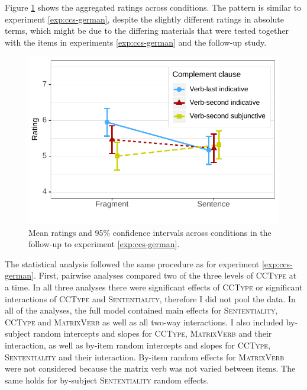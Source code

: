 Figure \ref{fig:ccs-german-short-estimates} shows the aggregated ratings across conditions. The pattern is similar to experiment \ref{exp:ccs-german}, despite the slightly different ratings in absolute terms, which might be due to the differing materials that were tested together with the items in experiments \ref{exp:ccs-german} and the follow-up study.
%
\begin{figure}[t]
\includegraphics[scale=1]{figures/ex2b_ccs_de_sc_estimates}
 \caption{Mean ratings and 95\% confidence intervals across conditions in the follow-up to experiment \ref{exp:ccs-german}. \label{fig:ccs-german-short-estimates}}
\end{figure}
%
The statistical analysis followed the same procedure as for experiment \ref{exp:ccs-german}. First, pairwise analyses compared two of the three levels of \textsc{CCType} at a time. In all three analyses there were significant effects of \textsc{CCType} or significant interactions of \textsc{CCType} and \textsc{Sententiality}, therefore I did not pool the data. In all of the analyses, the full model contained main effects for \textsc{Sententiality}, \textsc{CCType} and \textsc{MatrixVerb} as well as all two-way interactions. I also included by-subject random intercepts and slopes for \textsc{CCType}, \textsc{MatrixVerb} and their interaction, as well as by-item random intercepts and slopes for \textsc{CCType}, \textsc{Sententiality} and their interaction. By-item random effects for \textsc{MatrixVerb} were not considered because the matrix verb was not varied between items. The same holds for by-subject \textsc{Sententiality} random effects.

